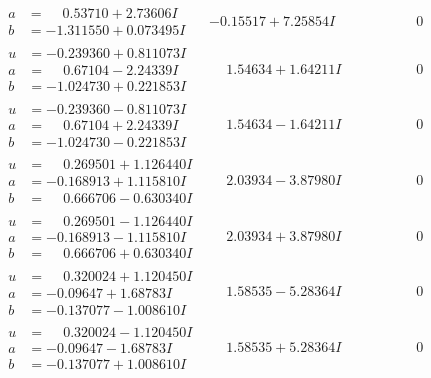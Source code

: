\documentclass[1p]{elsarticle_modified}
\theoremstyle{definition}
\begin{document}
$$\begin{array}{c|c|c}
\begin{aligned}
a &= \phantom{-}0.53710 + 2.73606 I \\
b &= -1.311550 + 0.073495 I\end{aligned}
 & -0.15517 + 7.25854 I & \phantom{-0.000000 } 0 \\ \hline\begin{aligned}
u &= -0.239360 + 0.811073 I \\
a &= \phantom{-}0.67104 - 2.24339 I \\
b &= -1.024730 + 0.221853 I\end{aligned}
 & \phantom{-}1.54634 + 1.64211 I & \phantom{-0.000000 } 0 \\ \hline\begin{aligned}
u &= -0.239360 - 0.811073 I \\
a &= \phantom{-}0.67104 + 2.24339 I \\
b &= -1.024730 - 0.221853 I\end{aligned}
 & \phantom{-}1.54634 - 1.64211 I & \phantom{-0.000000 } 0 \\ \hline\begin{aligned}
u &= \phantom{-}0.269501 + 1.126440 I \\
a &= -0.168913 + 1.115810 I \\
b &= \phantom{-}0.666706 - 0.630340 I\end{aligned}
 & \phantom{-}2.03934 - 3.87980 I & \phantom{-0.000000 } 0 \\ \hline\begin{aligned}
u &= \phantom{-}0.269501 - 1.126440 I \\
a &= -0.168913 - 1.115810 I \\
b &= \phantom{-}0.666706 + 0.630340 I\end{aligned}
 & \phantom{-}2.03934 + 3.87980 I & \phantom{-0.000000 } 0 \\ \hline\begin{aligned}
u &= \phantom{-}0.320024 + 1.120450 I \\
a &= -0.09647 + 1.68783 I \\
b &= -0.137077 - 1.008610 I\end{aligned}
 & \phantom{-}1.58535 - 5.28364 I & \phantom{-0.000000 } 0 \\ \hline\begin{aligned}
u &= \phantom{-}0.320024 - 1.120450 I \\
a &= -0.09647 - 1.68783 I \\
b &= -0.137077 + 1.008610 I\end{aligned}
 & \phantom{-}1.58535 + 5.28364 I & \phantom{-0.000000 } 0\\

\end{array}$$
\end{document}
